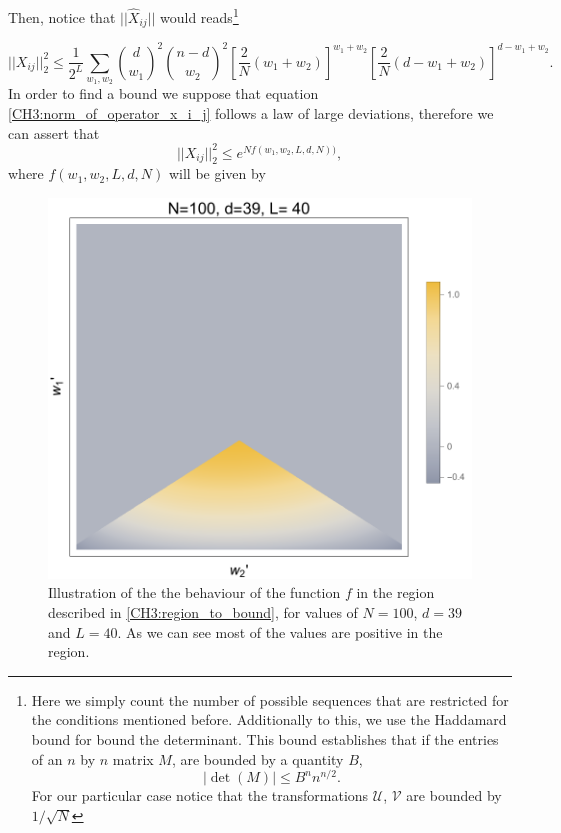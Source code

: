 Then, notice that $||\hat{X}_{ij}||$ would reads\footnote{Here we simply count the number of possible sequences that are restricted for the conditions mentioned before. Additionally to this, we use the Haddamard bound for bound the determinant. This bound establishes that if the entries of an $n$ by $n$ matrix $M$, are bounded by a quantity $B$,
\[ 
 \left|\det(M)\right|\leq B^{n}n^{n/2}.
 \]
 For our particular case notice that the transformations $\mathcal{U}$, $\mathcal{V}$ are bounded by $1/\sqrt{N}$}

\begin{equation}
    ||X_{ij}||_{2}^2 \leq \frac{1}{2^L}\sum_{w_1,w_2} {d\choose w_1}^2 {n-d\choose w_2}^2 \left[\frac{2}{N}(w_1+w_2)\right]^{w_1+w_2}
    \left[\frac{2}{N}(d-w_1+w_2)\right]^{d-w_1+w_2}.
    \label{CH3:norm_of_operator_x_i_j}
\end{equation}
 In order to find a bound we suppose that equation \eqref{CH3:norm_of_operator_x_i_j} follows a law of large deviations, therefore we can assert that 
 \begin{equation}
    ||X_{ij}||_{2}^2\leq e^{Nf(w_1,w_2,L,d,N))},
\end{equation}
where $f(w_1,w_2,L,d,N)$ will be given by
\begin{figure}
\centering
\includegraphics[width = 0.6 \textwidth]{Figures/Results_weights.pdf}
\caption{Illustration of the the behaviour of the function $f$ in the region described in \eqref{CH3:region_to_bound},  for values of $N=100$, $d=39$ and $L=40$. As we can see most of the values are positive in the region.}
       \label{CH3:illustration_function_region}
\end{figure}

